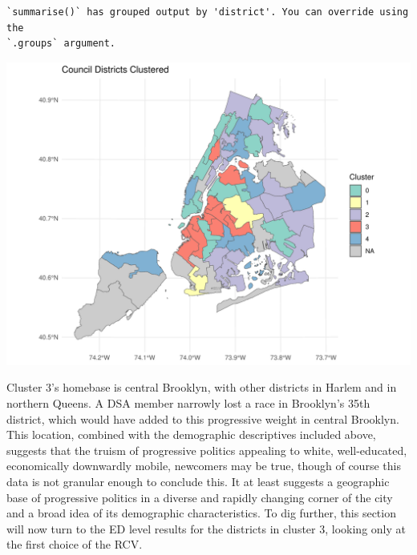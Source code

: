 \documentclass[
  letterpaper,
  DIV=11,
  numbers=noendperiod]{scrartcl}
\begin{document}
\begin{verbatim}
`summarise()` has grouped output by 'district'. You can override using the
`.groups` argument.
\end{verbatim}

\includegraphics{pdf_test_files/figure-pdf/figure 1-1.pdf}

Cluster 3's homebase is central Brooklyn, with other districts in Harlem
and in northern Queens. A DSA member narrowly lost a race in Brooklyn's
35th district, which would have added to this progressive weight in
central Brooklyn. This location, combined with the demographic
descriptives included above, suggests that the truism of progressive
politics appealing to white, well-educated, economically downwardly
mobile, newcomers may be true, though of course this data is not
granular enough to conclude this. It at least suggests a geographic base
of progressive politics in a diverse and rapidly changing corner of the
city and a broad idea of its demographic characteristics. To dig
further, this section will now turn to the ED level results for the
districts in cluster 3, looking only at the first choice of the RCV.
\end{document}
